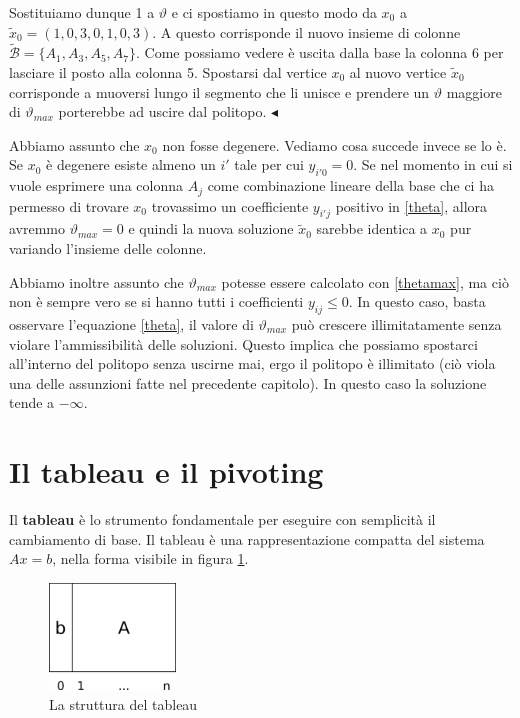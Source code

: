 \documentclass[11pt]{book}
\begin{document}
Sostituiamo dunque 1 a $\vartheta$ e ci spostiamo in questo modo da
$x_0$ a $\tilde{x}_0 = (1, 0, 3, 0, 1, 0, 3)$. A questo corrisponde il
nuovo insieme di colonne $\mathcal{\tilde{B}} = \{ A_1, A_3, A_5,
A_7\}$. Come possiamo vedere \`e uscita dalla base la colonna 6 per
lasciare il posto alla colonna 5. Spostarsi dal vertice $x_0$ al nuovo
vertice $\tilde{x}_0$ corrisponde a muoversi lungo il segmento che li
unisce e prendere un $\vartheta$ maggiore di $\vartheta_{max}$
porterebbe ad uscire dal politopo. $\blacktriangleleft$
\newline
\vspace{11pt}

Abbiamo assunto che $x_0$ non fosse degenere. Vediamo cosa succede
invece se lo \`e. Se $x_0$ \`e degenere esiste almeno un $i'$ tale per
cui $y_{i'0} = 0$. Se nel momento in cui si vuole esprimere una
colonna $A_j$ come combinazione lineare della base che ci ha permesso
di trovare $x_0$ trovassimo un coefficiente $y_{i'j}$ positivo in
\ref{theta}, allora avremmo $\vartheta_{max} = 0$ e quindi la nuova
soluzione $\tilde{x}_0$ sarebbe identica a $x_0$ pur variando
l'insieme delle colonne.

Abbiamo inoltre assunto che $\vartheta_{max}$ potesse essere calcolato
con \ref{thetamax}, ma ci\`o non \`e sempre vero se si hanno tutti i
coefficienti $y_{ij} \leq 0$. In questo caso, basta osservare
l'equazione \ref{theta}, il valore di $\vartheta_{max}$ pu\`o crescere
illimitatamente senza violare l'ammissibilit\`a delle
soluzioni. Questo implica che possiamo spostarci all'interno del
politopo senza uscirne mai, ergo il politopo \`e illimitato (ci\`o
viola una delle assunzioni fatte nel precedente capitolo). In questo
caso la soluzione tende a $-\infty$.

\section{Il tableau e il pivoting}

Il {\bf tableau} \`e lo strumento fondamentale per eseguire con
semplicit\`a il cambiamento di base. Il tableau \`e una
rappresentazione compatta del sistema $Ax=b$, nella forma visibile in
figura \ref{tableau}.

\begin{figure}[h!]
  \centering
  \includegraphics[width=0.3\textwidth]{images/tableau.png}
  \caption{La struttura del tableau}
  \label{tableau}
\end{figure}
\end{document}
